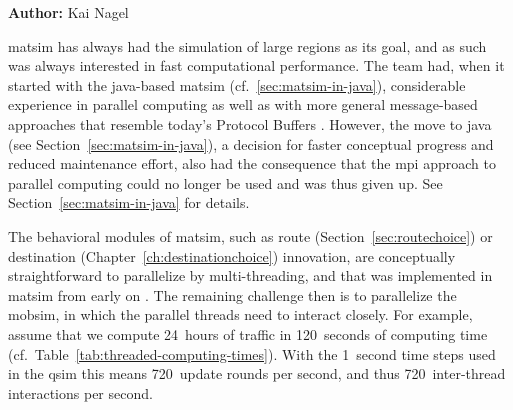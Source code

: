 \hfill \textbf{Author:} Kai Nagel


\gls{matsim} has always had the simulation of large regions as its goal, and as such was always interested in fast  computational performance.  The team had, when it started with the \gls{java}-based \gls{matsim} (cf.~\ref{sec:matsim-in-java}), considerable experience in parallel computing \citep{NagelSchleicher1994Microscopictrafficmodeling,RickertNagel1999hpcn99,NagelRickert2001parallel,CetinBurriNagel2003queue} as well as with more general message-based approaches \citep{GloorNagel2005ped-att04-birkh} that resemble today's Protocol Buffers 
\citep[][]{ProtocolBuffers_Webpage_2015}.
%
However, the move to \gls{java} (see Section~\ref{sec:matsim-in-java}), a decision for faster conceptual progress and reduced maintenance effort, also had the consequence that the \gls{mpi} approach to parallel computing could no longer be used and was thus given up.  See Section~\ref{sec:matsim-in-java} for details.



The behavioral modules of \gls{matsim}, such as route (Section~\ref{sec:routechoice}) or destination (Chapter~\ref{ch:destinationchoice}) innovation, are conceptually straightforward to parallelize by multi-threading, and that was implemented in \gls{matsim} from early on \citep[][see Section~\ref{sec:using-parallel-computing} how to use this]{BalmerEtc2008matsim-arch-perf-MAS-TT}.  The remaining challenge then is to parallelize the \gls{mobsim}, in which the parallel threads need to interact closely.  For example, assume that we compute 24~hours of traffic in 120~seconds of computing time (cf.~Table~\ref{tab:threaded-computing-times}).  With the 1~second time steps used in the \gls{qsim} this means 720~update rounds per second, and thus 720~inter-thread interactions per second.

